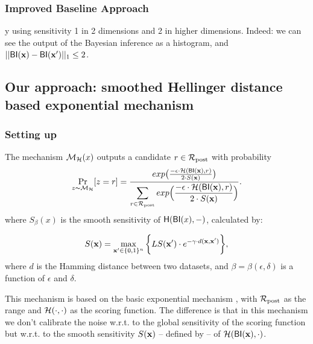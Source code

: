 \documentclass[sigconf]{acmart}
\begin{document}
\subsubsection{Improved Baseline Approach}

y using sensitivity 1 in 2 dimensions and 2 in higher dimensions.
    Indeed: we can see the output of the Bayesian inference as a histogram, and $||\mathsf{BI}(\textbf{x})-\mathsf{BI}(\textbf{x}')||_1 \leq 2$.


\subsection{Our approach: smoothed Hellinger distance based exponential mechanism}
\label{sec_smoo}

\subsubsection{Setting up}

\begin{definition}
\label{def_smoo}
The mechanism $\mathcal{M}_{\mathcal{H}}(x)$ outputs a candidate $r \in \mathcal{R}_{\textup{post}}$ with probability
\begin{equation*}
\underset{z \thicksim \mathcal{M}_{\mathcal{H}}}{\Pr}[z=r] = \frac {exp\big(\frac{-\epsilon\cdot\mathcal{H}(\mathsf{BI}(\textbf{x}),r)}{2\cdot S(\textbf{x})}\big)}
{\displaystyle\sum_{r\in\mathcal{R}_{\textup{post}}} exp\Big(\frac{-\epsilon\cdot\mathcal{H}(\mathsf{BI}(\textbf{x}),r)}{2\cdot S(\textbf{x})}\Big)}.
\end{equation*}
where $S_\beta(x)$ is the smooth sensitivity of $\mathsf{H}(\mathsf{BI}(x),-)$, calculated by:

\begin{equation}
  \label{eq:smooth}
   S(\textbf{x})=\max_{\textbf{x}' \in \{0,1\}^{n}}\bigg \{LS(\textbf{x}') \cdot e^{-\gamma\cdot d(\textbf{x},\textbf{x}')}\bigg\},
\end{equation}
where $d$ is the Hamming distance between two datasets, and $\beta =
\beta(\epsilon, \delta)$ is a function of $\epsilon$ and $\delta$. 
\end{definition}

This mechanism is based on the basic exponential mechanism
\cite{talwar}, with $\mathcal{R}_{\textup{post}}$ as the range and
$\mathcal{H}(\cdot,\cdot)$ as the scoring function. The difference is
that in this mechanism we don't calibrate the noise w.r.t. to the
global sensitivity of the scoring function but w.r.t. to the smooth
sensitivity $S(\textbf{x})$ -- defined by \citet{nissim2007smooth}-- of
$\mathcal{H}(\mathsf{BI}(\textbf{x}), \cdot)$.
\end{document}
